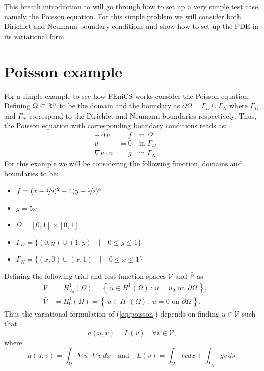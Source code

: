 This breath introduction to \fenics will go through how to set up a very simple test case, namely the Poisson equation. For this simple problem we will consider both Dirichlet and Neumann boundary conditions and show how to set up the PDE in its variational form.


\section{Poisson example}

For a simple example to see how FEniCS works consider the Poisson equation. Defining $\Omega \subset \mathbb{R}^n$ to be the domain and the boundary as $\partial \Omega = \Gamma_D \cup \Gamma_N$ where $\Gamma_D$ and $\Gamma_N$ correspond to the Dirichlet and Neumann boundaries respectively. Thus, the Poisson equation with corresponding boundary conditions reads as:
\begin{equation} \label{eq:poisson}
 \left. \begin{aligned}
-\Delta u &= f \quad \mbox{in } \Omega\\
 u &= 0 \quad \mbox{in } \Gamma_D\\
\nabla u \cdot n &= g \quad \mbox{in } \Gamma_N
    \end{aligned}
 \right.
 \qquad \text{}
\end{equation}
For this example we will be considering the following function, domains and boundaries to be:
\begin{itemize}
\item $f = (x-\nicefrac{1}{2})^2-4(y-\nicefrac{1}{2})^4$
\item $g = 5x$
\item $\Omega = [0,1]\times[0,1]$
\item $\Gamma_D = \{(0,y) \cup (1,y) \quad | \quad  0\leq y\leq 1\}$
\item $\Gamma_N = \{(x,0) \cup (x,1) \quad | \quad  0\leq x\leq 1\}$
\end{itemize}
Defining the following trial and test function spaces  $\mathcal{V}$ and $\bar{\mathcal{V}}$ as
\begin{equation} \label{eq:PoissonFuncSpace}
 \left. \begin{aligned}
    \mathcal{V}&=H^1_{u_0}(\Omega)=\left\{\,{u}\in H^1(\Omega)\,:\,\text{${u}=u_{0}$ on $\partial\Omega$}\,\right\}, \\
    \bar{\mathcal{V}}&=H^1_0(\Omega)=\left\{\,{u}\in H^1(\Omega)\,:\,\text{${u}={0}$ on $\partial\Omega$}\,\right\}.
 \end{aligned}
 \right.
 \qquad \text{}
\end{equation}
Thus the variational formulation of (\ref{eq:poisson}) depends on finding $u \in \mathcal{V}$ such that
\begin{equation}
\label{eq:PoissonWeak}a(u,v) = L(v) \quad \forall v\in\bar{\mathcal{V}},
\end{equation}
where
\begin{equation}
a(u,v) = \int_{\Omega} \nabla u \cdot \nabla v \, dx \quad \mbox{and} \quad L(v) = \int_{\Omega} fv dx +\int_{\Gamma_N}gv\,ds.
\end{equation}

